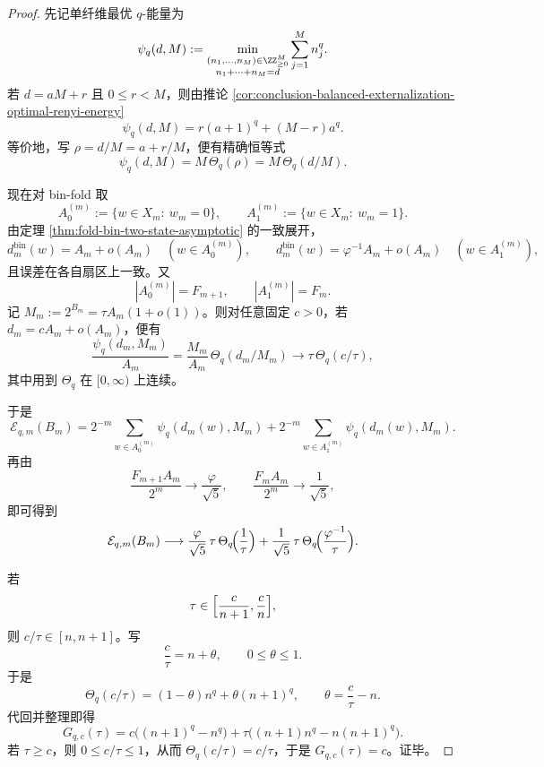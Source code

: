 \begin{proof}
先记单纤维最优 \(q\)-能量为
\[
\psi_q(d,M):=
\min_{\substack{(n_1,\dots,n_M)\in\ZZ_{\ge 0}^M\\ n_1+\cdots+n_M=d}}
\sum_{j=1}^{M}n_j^q.
\]
若 \(d=aM+r\) 且 \(0\le r<M\)，则由推论 \ref{cor:conclusion-balanced-externalization-optimal-renyi-energy}
\[
\psi_q(d,M)=r(a+1)^q+(M-r)a^q.
\]
等价地，写 \(\rho=d/M=a+r/M\)，便有精确恒等式
\[
\psi_q(d,M)=M\,\Theta_q(\rho)=M\,\Theta_q(d/M).
\]

现在对 bin-fold 取
\[
A_0^{(m)}:=\{w\in X_m:\ w_m=0\},
\qquad
A_1^{(m)}:=\{w\in X_m:\ w_m=1\}.
\]
由定理 \ref{thm:fold-bin-two-state-asymptotic} 的一致展开，
\[
d_m^{\mathrm{bin}}(w)=A_m+o(A_m)
\quad (w\in A_0^{(m)}),
\qquad
d_m^{\mathrm{bin}}(w)=\varphi^{-1}A_m+o(A_m)
\quad (w\in A_1^{(m)}),
\]
且误差在各自扇区上一致。又
\[
|A_0^{(m)}|=F_{m+1},
\qquad
|A_1^{(m)}|=F_m.
\]
记 \(M_m:=2^{B_m}=\tau A_m(1+o(1))\)。则对任意固定 \(c>0\)，若 \(d_m=cA_m+o(A_m)\)，便有
\[
\frac{\psi_q(d_m,M_m)}{A_m}
=
\frac{M_m}{A_m}\,\Theta_q(d_m/M_m)
\longrightarrow
\tau\,\Theta_q(c/\tau),
\]
其中用到 \(\Theta_q\) 在 \([0,\infty)\) 上连续。

于是
\[
\mathcal E_{q,m}(B_m)
=
2^{-m}\sum_{w\in A_0^{(m)}}\psi_q(d_m(w),M_m)
+
2^{-m}\sum_{w\in A_1^{(m)}}\psi_q(d_m(w),M_m).
\]
再由
\[
\frac{F_{m+1}A_m}{2^m}\longrightarrow \frac{\varphi}{\sqrt5},
\qquad
\frac{F_mA_m}{2^m}\longrightarrow \frac1{\sqrt5},
\]
即可得到
\[
\mathcal E_{q,m}(B_m)\longrightarrow
\frac{\varphi}{\sqrt5}\,\tau\,\Theta_q\!\Bigl(\frac1\tau\Bigr)
+
\frac1{\sqrt5}\,\tau\,\Theta_q\!\Bigl(\frac{\varphi^{-1}}{\tau}\Bigr).
\]

若
\[
\tau\in\Bigl[\frac{c}{n+1},\frac{c}{n}\Bigr],
\]
则 \(c/\tau\in[n,n+1]\)。写
\[
\frac{c}{\tau}=n+\theta,
\qquad
0\le \theta\le 1.
\]
于是
\[
\Theta_q(c/\tau)=(1-\theta)n^q+\theta(n+1)^q,
\qquad
\theta=\frac{c}{\tau}-n.
\]
代回并整理即得
\[
G_{q,c}(\tau)
=
c\bigl((n+1)^q-n^q\bigr)
+
\tau\bigl((n+1)n^q-n(n+1)^q\bigr).
\]
若 \(\tau\ge c\)，则 \(0\le c/\tau\le 1\)，从而 \(\Theta_q(c/\tau)=c/\tau\)，于是 \(G_{q,c}(\tau)=c\)。证毕。
\end{proof}

